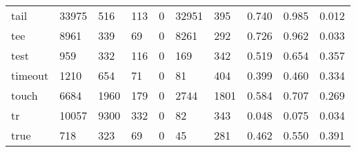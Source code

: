 \begin{longtable}{lp{2.0cm}p{2.0cm}p{2.0cm}p{2.0cm}p{2.0cm}p{2.0cm}p{2.0cm}p{2.0cm}p{2.0cm}}
tail      &                  33975 &                                516 &                               113 &                                0 &                             32951 &                             395 &                                0.740 &                                  0.985 &                                0.012 \\
tee       &                   8961 &                                339 &                                69 &                                0 &                              8261 &                             292 &                                0.726 &                                  0.962 &                                0.033 \\
test      &                    959 &                                332 &                               116 &                                0 &                               169 &                             342 &                                0.519 &                                  0.654 &                                0.357 \\
timeout   &                   1210 &                                654 &                                71 &                                0 &                                81 &                             404 &                                0.399 &                                  0.460 &                                0.334 \\
touch     &                   6684 &                               1960 &                               179 &                                0 &                              2744 &                            1801 &                                0.584 &                                  0.707 &                                0.269 \\
tr        &                  10057 &                               9300 &                               332 &                                0 &                                82 &                             343 &                                0.048 &                                  0.075 &                                0.034 \\
true      &                    718 &                                323 &                                69 &                                0 &                                45 &                             281 &                                0.462 &                                  0.550 &                                0.391 \\

\end{longtable}
